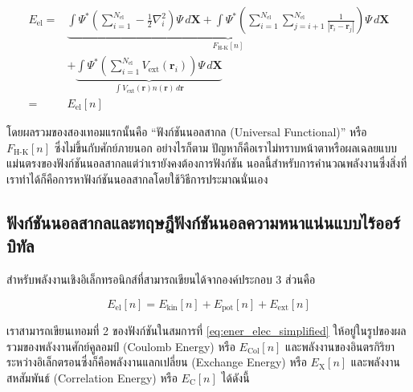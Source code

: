 \begin{align}\label{eq:ener_univer_ext_pot}
    E_{\text{el}} = & \underbrace{\int \Psi^{\ast}
        \left ( \sum^{N_{\text{el}}}_{i=1} -\frac{1}{2} \nabla^{2}_{i} \right )
        \Psi \, d\bm{X}
        + \int \Psi^{\ast}
        \left ( \sum^{N_{\text{el}}}_{i=1} \sum^{N_{\text{el}}}_{j=i+1} \frac{1}{|\bm{r}_{i}-\bm{r}_{j}|} \right )
    \Psi \, d\bm{X}}_{\textstyle F_{\text{H-K}}[n]} \nonumber       \\
                    & + \underbrace{\int \Psi^{\ast}
        \left ( \sum^{N_{\text{el}}}_{i=1} V_{\text{ext}}(\bm{r}_{i}) \right )
        \Psi \, d\bm{X}%
    }_{\textstyle \int V_{\text{ext}}(\bm{r}) n(\bm{r}) \, d\bm{r}} \\
    =               & E_{\text{el}}[n]
\end{align}

\noindent โดยผลรวมของสองเทอมแรกนั้นคือ \enquote{ฟังก์ชันนอลสากล (Universal Functional)} หรือ $F_{\text{H-K}}[n]$
ซึ่งไม่ขึ้นกับศักย์ภายนอก อย่างไรก็ตาม ปัญหาก็คือเราไม่ทราบหน้าตาหรือผลเฉลยแบบแม่นตรงของฟังก์ชันนอลสากลแต่ว่าเรายังคงต้องการฟังก์ชัน%
นอลนี้สำหรับการคำนวณพลังงานซึ่งสิ่งที่เราทำได้ก็คือการหาฟังก์ชันนอลสากลโดยใช้วิธีการประมาณนั่นเอง

\subsection{ฟังก์ชันนอลสากลและทฤษฎีฟังก์ชันนอลความหนาแน่นแบบไร้ออร์บิทัล}
\label{ssec:univer_functional}

สำหรับพลังงานเชิงอิเล็กทรอนิกส์ที่สามารถเขียนได้จากองค์ประกอบ 3 ส่วนคือ

\begin{equation}\label{eq:ener_elec_simplified}
    E_{\text{el}}[n] = E_{\text{kin}}[n] + E_{\text{pot}}[n] + E_{\text{ext}}[n]
\end{equation}

\noindent เราสามารถเขียนเทอมที่ 2 ของฟังก์ชันในสมการที่ \eqref{eq:ener_elec_simplified} ให้อยู่ในรูปของผลรวมของพลังงานศักย์คูลอมป์
(Coulomb Energy) หรือ $E_{\text{Col}}[n]$ และพลังงานของอินตรกิริยาระหว่างอิเล็กตรอนซึ่งก็คือพลังงานแลกเปลี่ยน (Exchange Energy)
หรือ $E_{\text{X}}[n]$ และพลังงานสหสัมพันธ์ (Correlation Energy) หรือ $E_{\text{C}}[n]$ ได้ดังนี้

